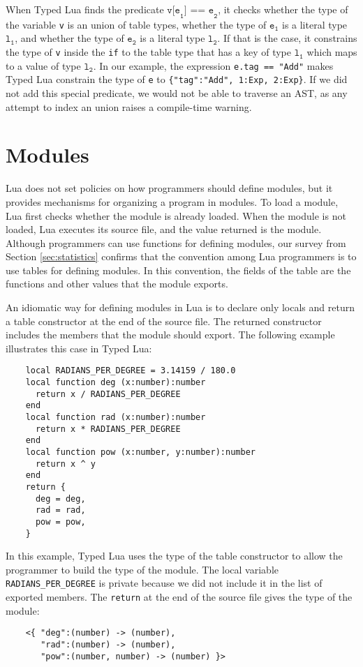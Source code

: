 When Typed Lua finds the predicate $\texttt{v[e}_{\texttt{1}}\texttt{] == e}_{\texttt{2}}$,
it checks whether the type of the variable \texttt{v} is an union of table types,
whether the type of $\texttt{e}_{\texttt{1}}$ is a literal type $\texttt{l}_{\texttt{1}}$,
and whether the type of $\texttt{e}_{\texttt{2}}$ is a literal type $\texttt{l}_{\texttt{2}}$.
If that is the case, it constrains the type of \texttt{v} inside
the \texttt{if} to the table type that has a key of type
$\texttt{l}_{\texttt{1}}$ which maps to a value of type $\texttt{l}_{\texttt{2}}$.
In our example, the expression \texttt{e.tag == "Add"} makes Typed Lua
constrain the type of \texttt{e} to \texttt{\{"tag":"Add", 1:Exp, 2:Exp\}}.
If we did not add this special predicate, we would not be able to traverse an AST,
as any attempt to index an union raises a compile-time warning.

\section{Modules}
\label{sec:modules}

Lua does not set policies on how programmers should define modules,
but it provides mechanisms for organizing a program in modules.
To load a module, Lua first checks whether the module is already loaded.
When the module is not loaded, Lua executes its source file, and
the value returned is the module.
Although programmers can use functions for defining modules,
our survey from Section \ref{sec:statistics} confirms that
the convention among Lua programmers is to use tables for defining modules. 
In this convention, the fields of the table are the functions and other
values that the module exports.

An idiomatic way for defining modules in Lua is to declare only locals
and return a table constructor at the end of the source file.
The returned constructor includes the members that the module should export.
The following example illustrates this case in Typed Lua:
\begin{verbatim}
    local RADIANS_PER_DEGREE = 3.14159 / 180.0
    local function deg (x:number):number
      return x / RADIANS_PER_DEGREE
    end
    local function rad (x:number):number
      return x * RADIANS_PER_DEGREE
    end
    local function pow (x:number, y:number):number
      return x ^ y
    end
    return {
      deg = deg,
      rad = rad,
      pow = pow,
    }
\end{verbatim}

In this example, Typed Lua uses the type of the table constructor
to allow the programmer to build the type of the module.
The local variable \texttt{RADIANS\string_PER\string_DEGREE}
is private because we did not include it in the list of exported members. 
The \texttt{return} at the end of the source file gives the type of the module:
\begin{verbatim}
    <{ "deg":(number) -> (number),
       "rad":(number) -> (number),
       "pow":(number, number) -> (number) }>
\end{verbatim}

